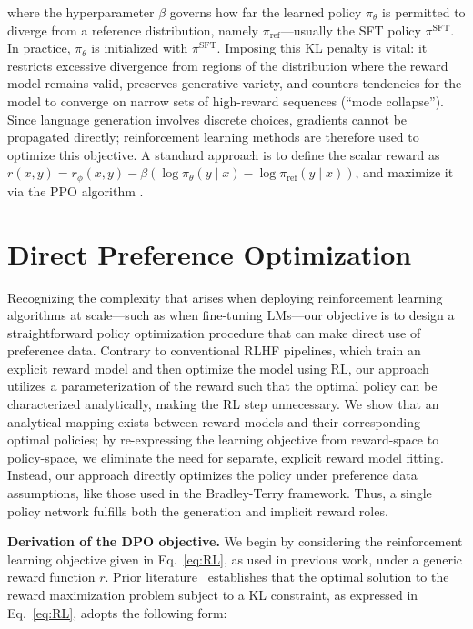 where the hyperparameter $\beta$ governs how far the learned policy $\pi_\theta$ is permitted to diverge from a reference distribution, namely $\pi_\text{ref}$—usually the SFT policy $\pi^\text{SFT}$. In practice, $\pi_\theta$ is initialized with $\pi^\text{SFT}$. Imposing this KL penalty is vital: it restricts excessive divergence from regions of the distribution where the reward model remains valid, preserves generative variety, and counters tendencies for the model to converge on narrow sets of high-reward sequences (“mode collapse”). Since language generation involves discrete choices, gradients cannot be propagated directly; reinforcement learning methods are therefore used to optimize this objective. A standard approach \citep{ziegler2020finetuning, stiennon2022learning, bai2022training, ouyang2022training} is to define the scalar reward as ${r(x, y) = r_{\phi}(x, y) -\beta (\log \pi_{\theta}(y\mid x) - \log \pi_\text{ref}(y\mid x))}$, and maximize it via the PPO algorithm \cite{schulman2017proximal}.

\section{Direct Preference Optimization}\label{sec:DPO}

Recognizing the complexity that arises when deploying reinforcement learning algorithms at scale—such as when fine-tuning LMs—our objective is to design a straightforward policy optimization procedure that can make direct use of preference data. Contrary to conventional RLHF pipelines, which train an explicit reward model and then optimize the model using RL, our approach utilizes a parameterization of the reward such that the optimal policy can be characterized analytically, making the RL step unnecessary. We show that an analytical mapping exists between reward models and their corresponding optimal policies; by re-expressing the learning objective from reward-space to policy-space, we eliminate the need for separate, explicit reward model fitting. Instead, our approach directly optimizes the policy under preference data assumptions, like those used in the Bradley-Terry framework. Thus, a single policy network fulfills both the generation and implicit reward roles.

\textbf{Derivation of the DPO objective.} We begin by considering the reinforcement learning objective given in Eq.~\ref{eq:RL}, as used in previous work, under a generic reward function $r$. Prior literature~\citep{peters2007reinforcement, peng2019advantage, korbak2022reinforcement, go2023aligning} establishes that the optimal solution to the reward maximization problem subject to a KL constraint, as expressed in Eq.~\ref{eq:RL}, adopts the following form:

